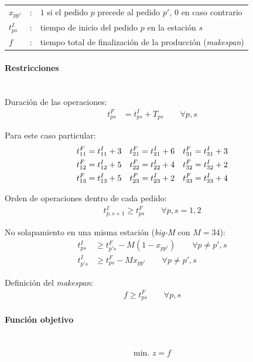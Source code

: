 \begin{tabular}{l c l}
$x_{pp'}$ & : & $1$ si el pedido $p$ precede al pedido $p'$, $0$ en caso contrario \\
$t^I_{ps}$ & : & tiempo de inicio del pedido $p$ en la estación $s$ \\
$f$ & : & tiempo total de finalización de la producción (\textit{makespan}) \\
\end{tabular}

\paragraph{Restricciones}\mbox{}\\

Duración de las operaciones:
\begin{align}
t^F_{ps} &= t^I_{ps} + T_{ps} \qquad \forall p,s
\end{align}

Para este caso particular:
\begin{align}
t^F_{11} &= t^I_{11} + 3 & t^F_{21} &= t^I_{21} + 6 & t^F_{31} &= t^I_{31} + 3 \notag \\
t^F_{12} &= t^I_{12} + 5 & t^F_{22} &= t^I_{22} + 4 & t^F_{32} &= t^I_{32} + 2 \notag \\
t^F_{13} &= t^I_{13} + 5 & t^F_{23} &= t^I_{23} + 2 & t^F_{33} &= t^I_{33} + 4
\end{align}

Orden de operaciones dentro de cada pedido:
\begin{align}
t^I_{p,s+1} \ge t^F_{ps} \qquad \forall p, s=1,2
\end{align}

No solapamiento en una misma estación (\textit{big-M} con $M=34$):
\begin{align}
t^I_{ps} &\ge t^F_{p's} - M(1 - x_{pp'}) \qquad \forall p \ne p', s \\
t^I_{p's} &\ge t^F_{ps} - M x_{pp'} \qquad \forall p \ne p', s
\end{align}

Definición del \textit{makespan}:
\begin{align}
f \ge t^F_{ps} \qquad \forall p,s
\end{align}

\paragraph{Función objetivo}\mbox{}\\
\begin{align}
\mbox{min. } z = f
\end{align}

